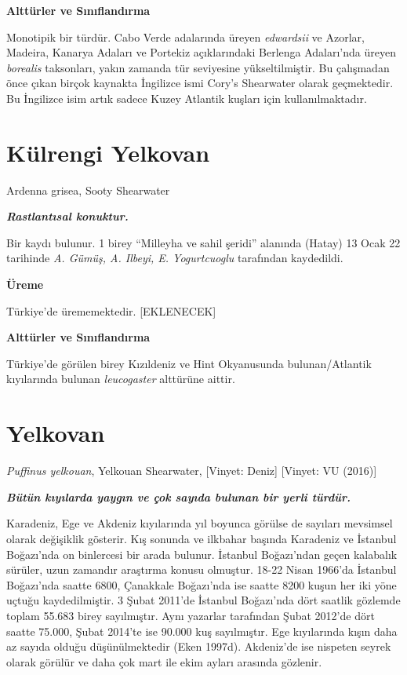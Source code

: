 \documentclass[
  letterpaper,
  DIV=11,
  numbers=noendperiod]{scrreprt}
\begin{document}
\textbf{Alttürler ve Sınıflandırma}

Monotipik bir türdür. Cabo Verde adalarında üreyen \emph{edwardsii} ve
Azorlar, Madeira, Kanarya Adaları ve Portekiz açıklarındaki Berlenga
Adaları'nda üreyen \emph{borealis} taksonları, yakın zamanda tür
seviyesine yükseltilmiştir. Bu çalışmadan önce çıkan birçok kaynakta
İngilizce ismi Cory's Shearwater olarak geçmektedir. Bu İngilizce isim
artık sadece Kuzey Atlantik kuşları için kullanılmaktadır.

\section{Külrengi Yelkovan}\label{kuxfclrengi-yelkovan}

Ardenna grisea, Sooty Shearwater

\textbf{\emph{Rastlantısal konuktur.}}

Bir kaydı bulunur. 1 birey ``Milleyha ve sahil şeridi'' alanında (Hatay)
13 Ocak 22 tarihinde \emph{A. Gümüş, A. Ilbeyi, E. Yogurtcuoglu}
tarafından kaydedildi.

\textbf{Üreme}

Türkiye'de ürememektedir. {[}EKLENECEK{]}

\textbf{Alttürler ve Sınıflandırma}

Türkiye'de görülen birey Kızıldeniz ve Hint Okyanusunda bulunan/Atlantik
kıyılarında bulunan \emph{leucogaster} alttürüne aittir.

\section{Yelkovan}\label{yelkovan}

\emph{Puffinus yelkouan}, Yelkouan Shearwater, {[}Vinyet: Deniz{]}
{[}Vinyet: VU (2016){]}

\textbf{\emph{Bütün kıyılarda yaygın ve çok sayıda bulunan bir yerli
türdür.}}

Karadeniz, Ege ve Akdeniz kıyılarında yıl boyunca görülse de sayıları
mevsimsel olarak değişiklik gösterir. Kış sonunda ve ilkbahar başında
Karadeniz ve İstanbul Boğazı'nda on binlercesi bir arada bulunur.
İstanbul Boğazı'ndan geçen kalabalık sürüler, uzun zamandır araştırma
konusu olmuştur. 18-22 Nisan 1966'da İstanbul Boğazı'nda saatte 6800,
Çanakkale Boğazı'nda ise saatte 8200 kuşun her iki yöne uçtuğu
kaydedilmiştir. 3 Şubat 2011'de İstanbul Boğazı'nda dört saatlik
gözlemde toplam 55.683 birey sayılmıştır. Aynı yazarlar tarafından Şubat
2012'de dört saatte 75.000, Şubat 2014'te ise 90.000 kuş sayılmıştır.
Ege kıyılarında kışın daha az sayıda olduğu düşünülmektedir (Eken
1997d). Akdeniz'de ise nispeten seyrek olarak görülür ve daha çok mart
ile ekim ayları arasında gözlenir.
\end{document}

